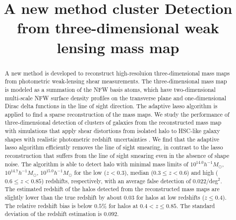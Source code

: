 \documentclass[twocolumn]{aastex63}
\begin{document}
\title{A new method cluster Detection from three-dimensional weak lensing mass map}

\begin{abstract}
A new method is developed to reconstruct high-resoluion three-dimensional mass
maps from photometric weak-lensing shear measurements. The three-dimensional
mass map is modeled as a summation of the NFW basis atoms, which have
two-dimensional multi-scale NFW surface density profiles on the transverse
plane and one-dimensional Dirac delta functions in the line of sight direction.
The adaptive lasso algorithm is applied to find a sparse reconstruction of the
mass maps.
We study the performance of three-dimensional detection of clusters of galaxies
from the reconstructed mass map with simulations that apply shear distortions
from isolated halo to HSC-like galaxy shapes with realistic photometric
redshift uncertainties .
We find that the adaptive lasso algorithm efficiently removes the line of sight
smearing, in contrast to the lasso reconstruction that suffers from  the line
of sight smearing even in the absence of shape noise.
The algorithm is able to detect halo with minimal mass limits of $10^{14.0}
h^{-1}M_{\odot}$, $10^{14.7} h^{-1}M_{\odot}$, $10^{15.0} h^{-1}M_{\odot}$ for the low
($z<0.3$), median ($0.3\leq z< 0.6$) and high ($0.6\leq z< 0.85$) redshifts,
respectively, with an average false detection of 0.022/deg$^2$.
The estimated redshift of the halos detected from the reconstructed mass maps
are slightly lower than the true redshift by about $0.03$ for halos at low
redshifts ($z\leq 0.4$). The relative redshift bias is below $0.5\%$ for halos
at $0.4<z\leq 0.85$. The standard deviation of the redshift estimation is
$0.092$.
\end{abstract}
\end{document}
